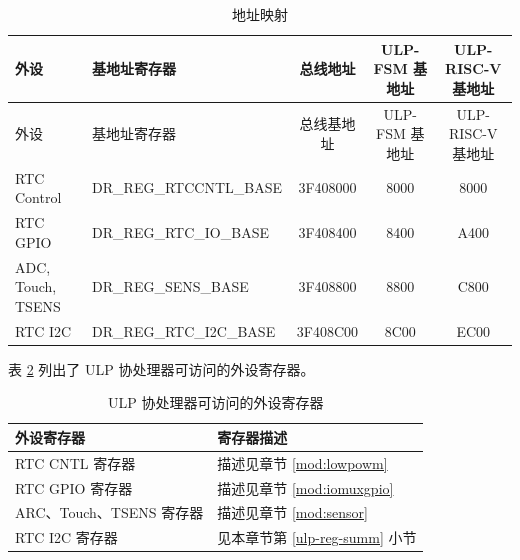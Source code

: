 \documentclass[main\_\_CN.tex]{subfiles}
\begin{document}
\begin{longtable}[c]{ |m{3.0cm}|m{4cm}|c|c|c| }
    \caption{地址映射}
    \label{tab: address-mapping}
    \\\hline
    \rowcolor{lightgray}
    \textbf{外设} & \textbf{基地址寄存器} & \textbf{总线地址} & \textbf{ULP-FSM 基地址} & \textbf{ULP-RISC-V 基地址} \\\hline
    \endfirsthead
    \hline
    \rowcolor{lightgray}
    外设 & 基地址寄存器 & 总线基地址 & ULP-FSM 基地址 & ULP-RISC-V 基地址\\\hline
    \endhead
    \hline
    \endfoot
   RTC Control & DR\_REG\_RTCCNTL\_BASE & \hexprefix{}3F408000 & \hexprefix{}8000 & \hexprefix{}8000 \\\hline
   RTC GPIO & DR\_REG\_RTC\_IO\_BASE & \hexprefix{}3F408400 &\hexprefix{}8400 & \hexprefix{}A400 \\\hline
   ADC, Touch, TSENS & DR\_REG\_SENS\_BASE & \hexprefix{}3F408800 & \hexprefix{}8800& \hexprefix{}C800\\\hline
   RTC I2C & DR\_REG\_RTC\_I2C\_BASE & \hexprefix{}3F408C00 & \hexprefix{}8C00 & \hexprefix{}EC00 \\\hline
\end{longtable}

表 \ref{tab:assiable-registers} 列出了 ULP 协处理器可访问的外设寄存器。

\begin{table}[H]
    \centering
    \caption{ULP 协处理器可访问的外设寄存器}\label{tab:assiable-registers}

    \begin{threeparttable}
    \begin{tabular}[c]{|p{6cm}|p{10cm}|}
    \hline
        \rowcolor{lightgray}
\textbf{外设寄存器} & \textbf{寄存器描述} \\\hline
RTC CNTL 寄存器 & 描述见章节 \ref{mod:lowpowm} \textit{\nameref{mod:lowpowm}} \\\hline
RTC GPIO 寄存器& 描述见章节 \ref{mod:iomuxgpio} \textit{\nameref{mod:iomuxgpio}} \\\hline
ARC、Touch、TSENS 寄存器 & 描述见章节 \ref{mod:sensor} \textit{\nameref{mod:sensor}} \\\hline
RTC I2C 寄存器 & 见本章节第 \ref{ulp-reg-summ} 小节 \textit{\nameref{ulp-reg-summ}} \\\hline
\end{tabular}
     \end{threeparttable}
    \end{table}
\end{document}
